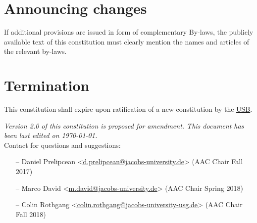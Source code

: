 \section{Announcing changes}
If additional provisions are issued in form of complementary By-laws, the publicly available text of this constitution must clearly mention the names and articles of the relevant by-laws.


\section{Termination}
This constitution shall expire upon ratification of a new constitution by the \hyperref[studentbody]{USB}.


\vfill
\nolinenumbers
\emph{Version 2.0 of this constitution is proposed for amendment. This document has been last edited on \today.}\\

Contact for questions and suggestions:
\begin{itemize}[nosep]
\item[--] Daniel Prelipcean <\url{d.prelipcean@jacobs-university.de}> (AAC Chair Fall 2017)
\item[--] Marco David <\url{m.david@jacobs-university.de}> (AAC Chair Spring 2018)
\item[--] Colin Rothgang <\url{colin.rothgang@jacobs-university-usg.de}> (AAC Chair Fall 2018)
\end{itemize}